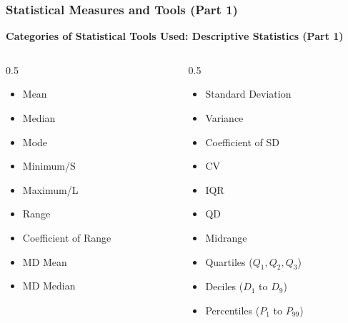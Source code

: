 \begin{frame}
    \frametitle{Statistical Measures and Tools (Part 1)}
    \textbf{Categories of Statistical Tools Used: Descriptive Statistics (Part 1)}
    \begin{columns}
        \begin{column}{0.5\textwidth}
            \begin{itemize}
                \item Mean
                \item Median
                \item Mode
                \item Minimum/S
                \item Maximum/L
                \item Range
                \item Coefficient of Range
                \item MD Mean
                \item MD Median
            \end{itemize}
        \end{column}
        \begin{column}{0.5\textwidth}
            \begin{itemize}
                \item Standard Deviation
                \item Variance
                \item Coefficient of SD
                \item CV
                \item IQR
                \item QD
                \item Midrange
                \item Quartiles ($Q_1, Q_2, Q_3$)
                \item Deciles ($D_1$ to $D_9$)
                \item Percentiles ($P_1$ to $P_{99}$)
            \end{itemize}
        \end{column}
    \end{columns}
\end{frame}

